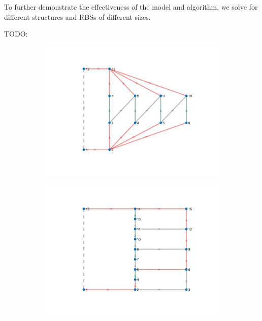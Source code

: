 \documentclass{article}
\begin{document}
To further demonstrate the effectiveness of the model and algorithm, we solve for different structures and RBSs of different sizes.

TODO: 

\begin{figure}[htbp]
  \centering
  \begin{subfigure}[b]{0.3\textwidth}
    \includegraphics[width=\textwidth]{../attachments/f-dege-mac-4.png}
    \caption{}
    \label{fig:f4-mac}
  \end{subfigure}
  \hspace{0.05\textwidth}
  \begin{subfigure}[b]{0.3\textwidth}
    \includegraphics[width=\textwidth]{../attachments/e-dege-mac-4.png}

\end{subfigure}
\end{figure}
\end{document}
